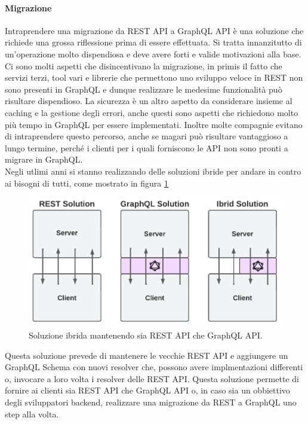 \paragraph{Migrazione}
Intraprendere una migrazione da REST API a GraphQL API è una soluzione che richiede una grossa riflessione prima di essere effettuata. Si tratta innanzitutto di un'operazione molto dispendiosa e deve avere forti e valide motivazioni alla base. Ci sono molti aspetti che disincentivano la migrazione, in primis il fatto che servizi terzi, tool vari e librerie che permettono uno sviluppo veloce in REST non sono presenti in GraphQL e dunque realizzare le medesime funzionalità può risultare dispendioso. La sicurezza è un altro aspetto da considerare insieme al caching e la gestione degli errori, anche questi sono aspetti che richiedono molto più tempo in GraphQL per essere implementati. Inoltre molte compagnie evitano di intraprendere questo percorso, anche se magari può risultare vantaggioso a lungo termine, perché i clienti per i quali forniscono le API non sono pronti a migrare in GraphQL.\\
Negli utlimi anni si stanno realizzando delle soluzioni ibride per andare in contro ai bisogni di tutti, come mostrato in figura \ref{ibrid-solution}
\FloatBarrier
\begin{figure}[!ht]
\centering
\includegraphics[width=0.8\linewidth]{immagini/ibridSolution.pdf}
\caption{Soluzione ibrida mantenendo sia REST API che GraphQL API.}
\label{ibrid-solution}
\end{figure}
\FloatBarrier
Questa soluzione prevede di mantenere le vecchie REST API e aggiungere un GraphQL Schema con nuovi resolver che, possono avere implmentazioni differenti o, invocare a loro volta i resolver delle REST API. Questa soluzione permette di fornire ai clienti sia REST API che GraphQL API o, in caso sia un obbiettivo degli sviluppatori backend, realizzare una migrazione da REST a GraphQL uno step alla volta.
\newpage
